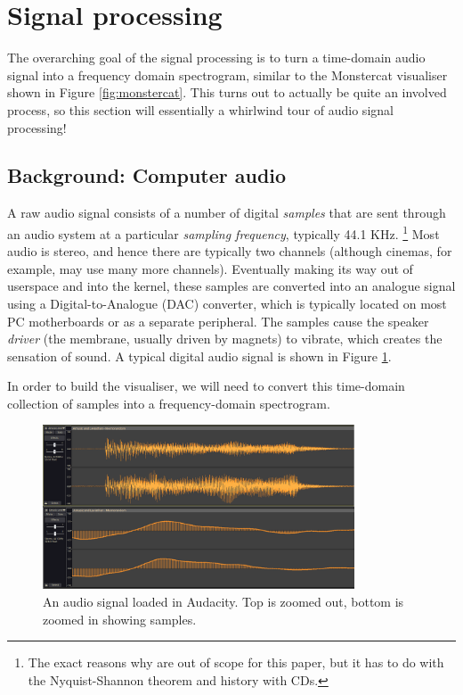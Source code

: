 \documentclass[11pt]{article}
\begin{document}
\section{Signal processing}
The overarching goal of the signal processing is to turn a time-domain audio signal into a frequency domain
spectrogram, similar to the Monstercat visualiser shown in Figure \ref{fig:monstercat}.
This turns out to actually
be quite an involved process, so this section will essentially a whirlwind tour of audio signal processing!

\subsection{Background: Computer audio}
A raw audio signal consists of a number of digital \textit{samples} that are sent through
an audio system at a particular \textit{sampling frequency}, typically 44.1 KHz.
\footnote{The exact reasons why are out of scope for this paper, but it has to do with the Nyquist-Shannon
theorem and history with CDs.}
Most audio is stereo, and hence there are typically two channels (although cinemas, for example, may use many
more channels). Eventually making its way out of userspace and into the kernel, these samples are converted
into an analogue signal using a Digital-to-Analogue (DAC) converter, which is typically located on most PC
motherboards or as a separate peripheral. The samples cause the speaker \textit{driver} (the membrane, usually
driven by magnets) to vibrate, which creates the sensation of sound. A typical digital audio signal is shown
in Figure \ref{fig:audiosignal}.

In order to build the visualiser, we will need to convert this time-domain collection of samples into a
frequency-domain spectrogram.

\begin{figure}[H]
\centering
\includegraphics[width=350px]{img/audiosignal.png}
\caption{An audio signal loaded in Audacity. Top is zoomed out, bottom is zoomed in showing samples.}
\label{fig:audiosignal}
\end{figure}
\end{document}
